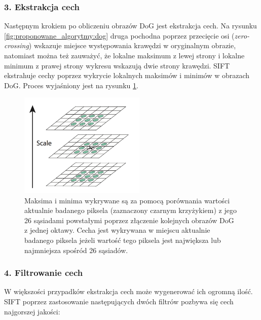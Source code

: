 \subsubsection{3. Ekstrakcja cech}
\label{sec:proponowane_algorytmy:ekstrakcja_cech}

Następnym krokiem po obliczeniu obrazów DoG jest ekstrakcja cech. Na rysunku \ref{fig:proponowane_algorytmy:dog} druga pochodna poprzez przecięcie osi (\textit{zero-crossing}) wskazuje miejsce występowania krawędzi w oryginalnym obrazie, natomiast można też zauważyć, że lokalne maksimum z lewej strony i lokalne minimum z prawej strony wykresu wskazują dwie strony krawędzi. SIFT ekstrahuje cechy poprzez wykrycie lokalnych maksimów i minimów w obrazach DoG. Proces wyjaśniony jest na rysunku \ref{fig:proponowane_algorytmy:max}.

\begin{figure}[H]
  \centering
  \includegraphics[width=6cm]{gfx/max}
  \caption{\cite{Lowe:2004:DIF:993451.996342} Maksima i minima wykrywane są za pomocą porównania wartości aktualnie badanego piksela (zaznaczony czarnym krzyżykiem) z jego 26 sąsiadami powstałymi poprzez złączenie kolejnych obrazów DoG z jednej oktawy. Cecha jest wykrywana w miejscu aktualnie badanego piksela jeżeli wartość tego piksela jest największa lub najmniejsza spośród 26 sąsiadów.}
  \label{fig:proponowane_algorytmy:max}
\end{figure}

\subsubsection{4. Filtrowanie cech}
\label{sec:proponowane_algorytmy:filtracja_cech}

W większości przypadków ekstrakcja cech może wygenerować ich ogromną ilość. SIFT poprzez zastosowanie następujących dwóch filtrów pozbywa się cech najgorszej jakości:

